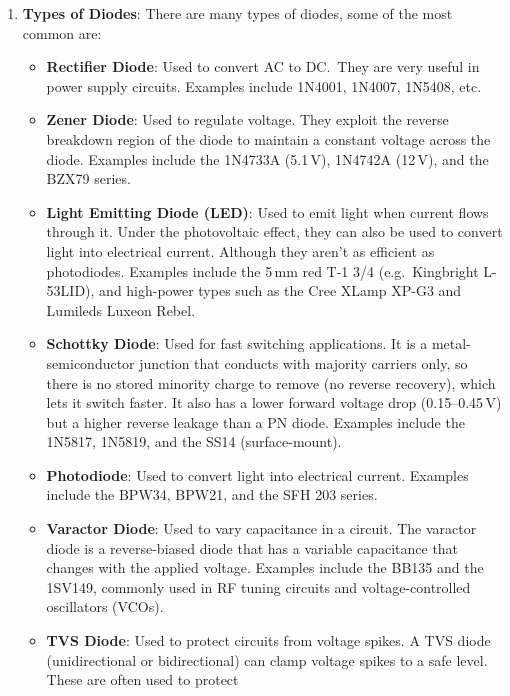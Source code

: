\begin{enumerate}
  \item \textbf{Types of Diodes}:
    There are many types of diodes, some of the most common are:
    \begin{itemize}
      \item \textbf{Rectifier Diode}: Used to convert AC to DC.\ They
        are very useful in power supply circuits. Examples include 1N4001,
        1N4007, 1N5408, etc.
      \item \textbf{Zener Diode}: Used to regulate voltage. They exploit
        the reverse breakdown region of the diode to maintain a
        constant voltage across the diode. Examples include the
        1N4733A (5.1\,V), 1N4742A (12\,V), and the BZX79 series.
      \item \textbf{Light Emitting Diode (LED)}: Used to emit
        light when current flows through it. Under the photovoltaic
        effect, they can also be used to convert light into electrical
        current. Although they aren't as efficient as photodiodes.
        Examples include the 5\,mm red T-1 3/4 (e.g.\ Kingbright L-53LID),
        and high-power types such as the Cree XLamp XP-G3 and Lumileds
        Luxeon Rebel.
      \item \textbf{Schottky Diode}: Used for fast switching
        applications. It is a metal-semiconductor junction that conducts
        with majority carriers only, so there is no stored minority
        charge to remove (no reverse recovery), which lets it switch
        faster. It also has a lower forward voltage drop (0.15--0.45\,V)
        but a higher reverse leakage than a PN diode. Examples include the 1N5817, 1N5819, and the
        SS14 (surface-mount).
      \item \textbf{Photodiode}: Used to convert light into
        electrical current. Examples include the BPW34, BPW21, and
        the SFH 203 series.
      \item \textbf{Varactor Diode}: Used to vary capacitance in
        a circuit. The varactor diode is a reverse-biased diode that
        has a variable capacitance that changes with the applied voltage.
        Examples include the BB135 and the 1SV149, commonly used in
        RF tuning circuits and voltage-controlled oscillators (VCOs).
      \item \textbf{TVS Diode}: Used to protect circuits from voltage
        spikes. A TVS diode (unidirectional or bidirectional) can clamp
        voltage spikes to a safe level. These are often used to protect

\end{itemize}
\end{enumerate}
